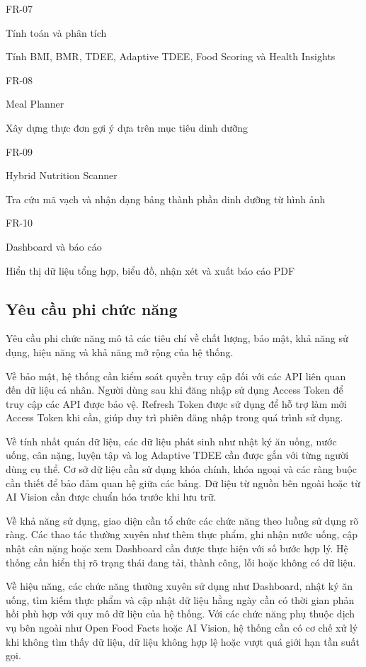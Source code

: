 \documentclass[12pt, a4paper]{report}
\begin{document}
FR-07

Tính toán và phân tích

Tính BMI, BMR, TDEE, Adaptive TDEE, Food Scoring và Health Insights

FR-08

Meal Planner

Xây dựng thực đơn gợi ý dựa trên mục tiêu dinh dưỡng

FR-09

Hybrid Nutrition Scanner

Tra cứu mã vạch và nhận dạng bảng thành phần dinh dưỡng từ hình ảnh

FR-10

Dashboard và báo cáo

Hiển thị dữ liệu tổng hợp, biểu đồ, nhận xét và xuất báo cáo PDF

\subsection{Yêu cầu phi chức năng}Yêu cầu phi chức năng mô tả các tiêu chí về chất lượng, bảo mật, khả năng sử dụng, hiệu năng và khả năng mở rộng của hệ thống.

Về bảo mật, hệ thống cần kiểm soát quyền truy cập đối với các API liên quan đến dữ liệu cá nhân. Người dùng sau khi đăng nhập sử dụng Access Token để truy cập các API được bảo vệ. Refresh Token được sử dụng để hỗ trợ làm mới Access Token khi cần, giúp duy trì phiên đăng nhập trong quá trình sử dụng.

Về tính nhất quán dữ liệu, các dữ liệu phát sinh như nhật ký ăn uống, nước uống, cân nặng, luyện tập và log Adaptive TDEE cần được gắn với từng người dùng cụ thể. Cơ sở dữ liệu cần sử dụng khóa chính, khóa ngoại và các ràng buộc cần thiết để bảo đảm quan hệ giữa các bảng. Dữ liệu từ nguồn bên ngoài hoặc từ AI Vision cần được chuẩn hóa trước khi lưu trữ.

Về khả năng sử dụng, giao diện cần tổ chức các chức năng theo luồng sử dụng rõ ràng. Các thao tác thường xuyên như thêm thực phẩm, ghi nhận nước uống, cập nhật cân nặng hoặc xem Dashboard cần được thực hiện với số bước hợp lý. Hệ thống cần hiển thị rõ trạng thái đang tải, thành công, lỗi hoặc không có dữ liệu.

Về hiệu năng, các chức năng thường xuyên sử dụng như Dashboard, nhật ký ăn uống, tìm kiếm thực phẩm và cập nhật dữ liệu hằng ngày cần có thời gian phản hồi phù hợp với quy mô dữ liệu của hệ thống. Với các chức năng phụ thuộc dịch vụ bên ngoài như Open Food Facts hoặc AI Vision, hệ thống cần có cơ chế xử lý khi không tìm thấy dữ liệu, dữ liệu không hợp lệ hoặc vượt quá giới hạn tần suất gọi.
\end{document}
